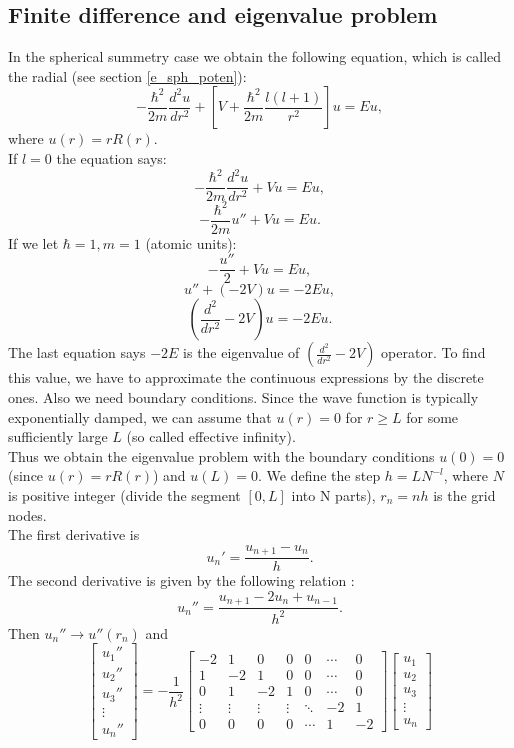 \documentclass[a4paper, 11pt]{article}
\begin{document}
\subsection{Finite difference and eigenvalue problem} \label{sec:numerical}
In the spherical summetry case we obtain the following equation, which is called the radial (see section \ref{e_sph_poten}): 
$$-\frac{\hbar^2}{2m}\frac{d^2 u}{d r^2}+[V+\frac{\hbar^2}{2m}\frac{l(l+1)}{r^2}]u = Eu,$$
where $u(r) = r R(r).$ \\
If  $l=0$ the equation says:
$$-\frac{\hbar^2}{2m}\frac{d^2 u}{d r^2}+Vu = Eu,$$
$$-\frac{\hbar^2}{2m}u''+Vu = Eu.$$
If we let $\hbar = 1, m=1$ (atomic units):
$$-\frac{u''}{2}+Vu = Eu,$$
$$u'' +(-2V)u = -2Eu,$$
$$(\frac{d^2}{d r^2}-2V)u = -2Eu.$$
The last equation says $-2E$ is the eigenvalue of $(\frac{d^2}{d r^2}-2V)$ operator. To find this value, we have to approximate the continuous expressions by the discrete ones. Also we need boundary conditions. Since the wave function is typically exponentially damped, we can assume that $ u (r) = 0 $ for $ r \geq L $ for some sufficiently large $ L $ (so called effective infinity). \\
Thus we obtain the eigenvalue problem with the boundary conditions $u(0) = 0$ (since $ u (r) = r R (r) $) and $ u (L) = 0 $. We define the step $ h = L N ^{-l}$, where $ N $ is  positive integer (divide the segment $ [0, L] $ into N parts), $ r_n = nh $ is the grid nodes.\\
The first derivative is 
 $$\displaystyle{{u_n'} = \frac{u_{n+1}-u_{n}}{h}}.$$ 
The second derivative is given by the following relation : $$\displaystyle{{u_n''} = \frac{u_{n+1}-2u_n +u_{n-1}}{h^2}}.$$ 
Then $ u_n'' \to u''(r_n)$ and 
$$\displaystyle{
\begin{bmatrix}
u_1'' \\
u_2'' \\
u_3'' \\
\vdots \\
u_n''
\end{bmatrix}
 = -\frac{1}{h^2} \begin{bmatrix}
-2 & 1 &0&0&0& \cdots & 0 \\
1 & -2 & 1& 0&0&\cdots & 0 \\  
0&1 & -2 & 1& 0&\cdots & 0 \\  
\vdots & \vdots &\vdots & \vdots & \ddots & -2& 1  \\
0 & 0&0 &0& \cdots &1 & -2
\end{bmatrix}
\begin{bmatrix}
u_1
\\
u_2
\\
u_3
\\
\vdots
\\
u_n
\end{bmatrix}}$$
\end{document}
